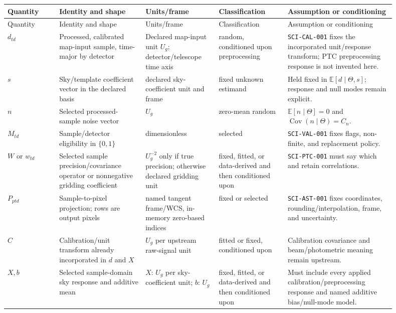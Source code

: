 \documentclass[11pt]{article}
\newcommand{\E}{\mathbb{E}}
\newcommand{\Cov}{\operatorname{Cov}}
\newcommand{\code}[1]{\nolinkurl{#1}}
\begin{document}
\begin{longtable}{L{0.12\linewidth}L{0.20\linewidth}L{0.17\linewidth}L{0.16\linewidth}L{0.25\linewidth}}
\toprule
Quantity & Identity and shape & Units/frame & Classification & Assumption or conditioning\\
\midrule
\endfirsthead
\toprule
Quantity & Identity and shape & Units/frame & Classification & Assumption or conditioning\\
\midrule
\endhead
\(d_{td}\) & Processed, calibrated map-input sample, time-major by detector &
Declared map-input unit \(U_g\); detector/telescope time axis & random,
conditioned upon preprocessing & \code{SCI-CAL-001} fixes the incorporated
unit/response transform; PTC preprocessing response is not invented here.\\
\(s\) & Sky/template coefficient vector in the declared basis &
declared sky-coefficient unit and frame & fixed unknown estimand & Held fixed in
\(\E[d\mid\Theta,s]\); response and null modes remain
explicit.\\
\(n\) & Selected processed-sample noise vector & \(U_g\) &
zero-mean random & \(\E[n\mid\Theta]=0\) and
\(\Cov(n\mid\Theta)=C_n\).\\
\(M_{td}\) & Sample/detector eligibility in \(\{0,1\}\) & dimensionless &
selected & \code{SCI-VAL-001} fixes flags, non-finite, and replacement policy.\\
\(W\) or \(w_{td}\) & Selected sample precision/covariance operator or
nonnegative gridding coefficient & \(U_g^{-2}\) only if true precision;
otherwise declared gridding unit & fixed, fitted, or data-derived and then
conditioned upon & \code{SCI-PTC-001} must say which and retain correlations.\\
\(P_{ptd}\) & Sample-to-pixel projection; rows are output pixels & named tangent
frame/WCS, in-memory zero-based indices & fixed or selected &
\code{SCI-AST-001} fixes coordinates, rounding/interpolation, frame, and
uncertainty.\\
\(C\) & Calibration/unit transform already incorporated in \(d\) and \(X\) &
\(U_g\) per upstream raw-signal unit & fitted or fixed, conditioned upon &
Calibration covariance and beam/photometric meaning remain upstream.\\
\(X,b\) & Selected sample-domain sky response and additive mean &
\(X\): \(U_g\) per sky-coefficient unit; \(b\): \(U_g\) & fixed,
fitted, or data-derived and then conditioned upon & Must include every applied
calibration/preprocessing response and named additive bias/null-mode model.\\

\end{longtable}
\end{document}
